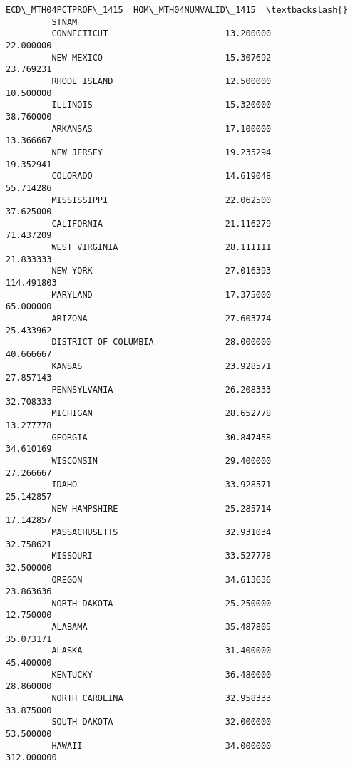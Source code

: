 \documentclass[11pt]{article}
\begin{document}
\begin{Verbatim}[commandchars=\\\{\}]
                               ECD\_MTH04PCTPROF\_1415  HOM\_MTH04NUMVALID\_1415  \textbackslash{}
         STNAM                                                                 
         CONNECTICUT                       13.200000               22.000000   
         NEW MEXICO                        15.307692               23.769231   
         RHODE ISLAND                      12.500000               10.500000   
         ILLINOIS                          15.320000               38.760000   
         ARKANSAS                          17.100000               13.366667   
         NEW JERSEY                        19.235294               19.352941   
         COLORADO                          14.619048               55.714286   
         MISSISSIPPI                       22.062500               37.625000   
         CALIFORNIA                        21.116279               71.437209   
         WEST VIRGINIA                     28.111111               21.833333   
         NEW YORK                          27.016393              114.491803   
         MARYLAND                          17.375000               65.000000   
         ARIZONA                           27.603774               25.433962   
         DISTRICT OF COLUMBIA              28.000000               40.666667   
         KANSAS                            23.928571               27.857143   
         PENNSYLVANIA                      26.208333               32.708333   
         MICHIGAN                          28.652778               13.277778   
         GEORGIA                           30.847458               34.610169   
         WISCONSIN                         29.400000               27.266667   
         IDAHO                             33.928571               25.142857   
         NEW HAMPSHIRE                     25.285714               17.142857   
         MASSACHUSETTS                     32.931034               32.758621   
         MISSOURI                          33.527778               32.500000   
         OREGON                            34.613636               23.863636   
         NORTH DAKOTA                      25.250000               12.750000   
         ALABAMA                           35.487805               35.073171   
         ALASKA                            31.400000               45.400000   
         KENTUCKY                          36.480000               28.860000   
         NORTH CAROLINA                    32.958333               33.875000   
         SOUTH DAKOTA                      32.000000               53.500000   
         HAWAII                            34.000000              312.000000   

\end{Verbatim}
\end{document}
